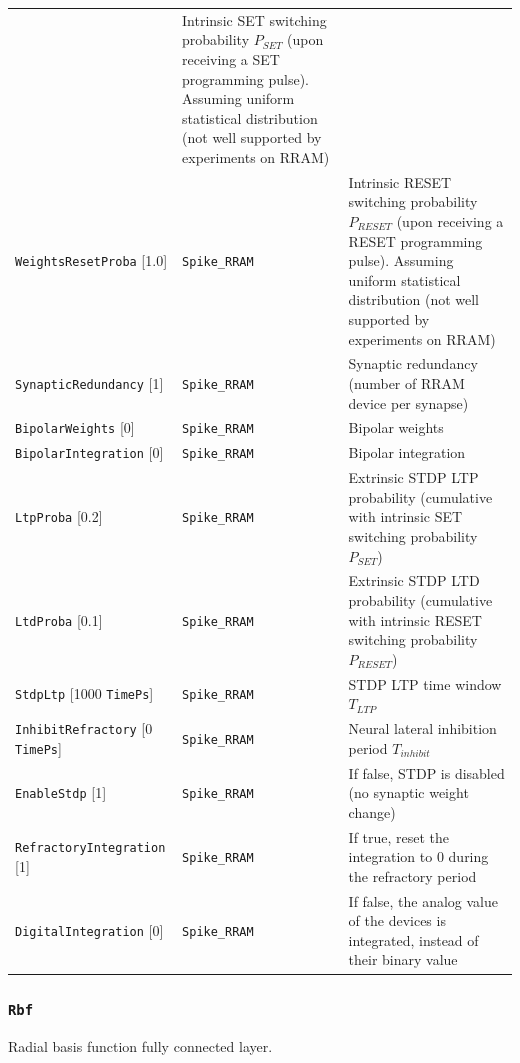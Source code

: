 \documentclass[a4paper,11pt,oneside]{article}
\newcommand{\iponly}{\reversemarginpar
    \marginnote{\color{listletiblue}\normalfont\scriptsize
    {\ttfamily{}\hyperref[sec:N2D2-IP]{\color{listletiblue}N2D2 IP}} \emph{only}}}
\begin{document}
\begin{center}
\begin{longtable}{| p{4cm} | p{3cm} | p{9cm} | }
    & Intrinsic SET switching probability $P_{SET}$ (upon receiving a SET
  programming pulse). Assuming uniform statistical distribution (not well
  supported by experiments on RRAM) \\
  \lstinline!WeightsResetProba! [1.0] & \lstinline!Spike_RRAM!
    & Intrinsic RESET switching probability $P_{RESET}$ (upon receiving a RESET
    programming pulse). Assuming uniform statistical distribution (not well
    supported by experiments on RRAM) \\
  \lstinline!SynapticRedundancy! [1] & \lstinline!Spike_RRAM!
    & Synaptic redundancy (number of RRAM device per synapse) \\
  \cellcolor{expercolor}\lstinline!BipolarWeights! [0] & \lstinline!Spike_RRAM!
    & Bipolar weights \\
  \cellcolor{expercolor}\lstinline!BipolarIntegration! [0]
    & \lstinline!Spike_RRAM! & Bipolar integration \\
  \cellcolor{expercolor}\lstinline!LtpProba! [0.2] & \lstinline!Spike_RRAM!
    & Extrinsic STDP LTP probability (cumulative with intrinsic SET switching
    probability $P_{SET}$) \\
  \cellcolor{expercolor}\lstinline!LtdProba! [0.1] & \lstinline!Spike_RRAM!
    & Extrinsic STDP LTD probability (cumulative with intrinsic RESET switching
    probability $P_{RESET}$) \\
  \cellcolor{expercolor}\lstinline!StdpLtp! [1000 \lstinline!TimePs!]
    & \lstinline!Spike_RRAM! & STDP LTP time window $T_{LTP}$ \\
  \cellcolor{expercolor}\lstinline!InhibitRefractory! [0 \lstinline!TimePs!]
    & \lstinline!Spike_RRAM! & Neural lateral inhibition period $T_{inhibit}$ \\
  \cellcolor{expercolor}\lstinline!EnableStdp! [1] & \lstinline!Spike_RRAM!
    & If false, STDP is disabled (no synaptic weight change) \\
  \cellcolor{expercolor}\lstinline!RefractoryIntegration! [1]
    & \lstinline!Spike_RRAM! & If true, reset the integration to 0 during the
    refractory period \\
  \cellcolor{expercolor}\lstinline!DigitalIntegration! [0]
    & \lstinline!Spike_RRAM! & If false, the analog value of the devices is
    integrated, instead of their binary value \\
 \hline
\end{longtable}
\end{center}


\subsubsection{\texorpdfstring{%
\lstinline[basicstyle=\ttfamily\bfseries]!Rbf!\protect\iponly}{Rbf}}
Radial basis function fully connected layer.
\end{document}
